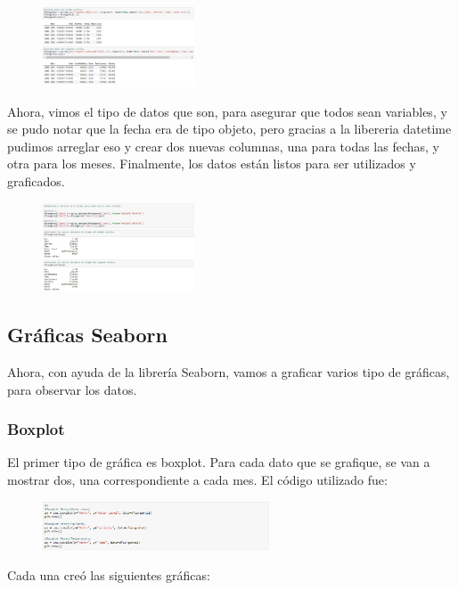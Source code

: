 \documentclass[a4paper]{article}
\begin{document}
\begin{figure}[h!]
 \centering
  \includegraphics[width=0.4\textwidth]{datos1.PNG}
\end{figure}

Ahora, vimos el tipo de datos que son, para asegurar que todos sean variables, y se pudo notar que la fecha era de tipo objeto, pero gracias a la libereria datetime pudimos arreglar eso y crear dos nuevas columnas, una para todas las fechas, y otra para los meses. Finalmente, los datos están listos para ser utilizados y graficados.  

\begin{figure}[ht!]
 \centering
  \includegraphics[width=0.4\textwidth]{datos2.PNG}
\end{figure}

\subsection{Gráficas Seaborn}
Ahora, con ayuda de la librería Seaborn, vamos a graficar varios tipo de gráficas, para observar los datos. 
\subsubsection{Boxplot}
El primer tipo de gráfica es boxplot. Para cada dato que se grafique, se van a mostrar dos, una correspondiente a cada mes. El código utilizado fue:
\begin{figure}[h!]
 \centering
  \includegraphics[width=0.6\textwidth]{BoxplotCodigo.PNG}
\end{figure}
Cada una creó las siguientes gráficas:
\end{document}

